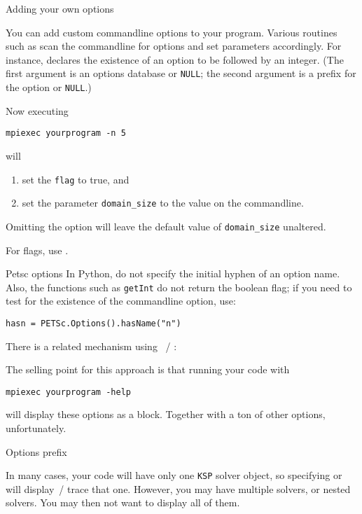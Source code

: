  {Adding your own options}

You can add custom 
commandline options to your program.
Various routines such as 
scan the commandline for options and set parameters accordingly.
For instance,
%
%
declares the existence of an option  to be followed by an integer.
(The first argument is an options database or \lstinline{NULL};
the second argument is a prefix for the option or \lstinline{NULL}.)

Now executing
\begin{verbatim}
mpiexec yourprogram -n 5
\end{verbatim}
will
\begin{enumerate}
\item set the \lstinline{flag} to true, and
\item set the parameter \lstinline{domain_size} to the value on the commandline.
\end{enumerate}
Omitting the  option will leave the default value of \lstinline{domain_size}
unaltered.

For flags, use .

\begin{pythonnote}{Petsc options}
  In Python, do not specify the initial hyphen of an option name.
  Also, the functions such as \lstinline{getInt} do not return the boolean flag;
  if you need to test for the existence of the commandline option, use:
\begin{verbatim}
hasn = PETSc.Options().hasName("n")
\end{verbatim}
\end{pythonnote}

There is a related mechanism using
~/ :

The selling point for this approach is that running your code with
\begin{verbatim}
mpiexec yourprogram -help
\end{verbatim}
will display these options as a block.
Together with a ton of other options, unfortunately.

 {Options prefix}

In many cases, your code will have only one \lstinline{KSP} solver object,
so specifying  or 
will display~/ trace that one.
However, you may have multiple solvers, or nested solvers. You may then
not want to display all of them.

